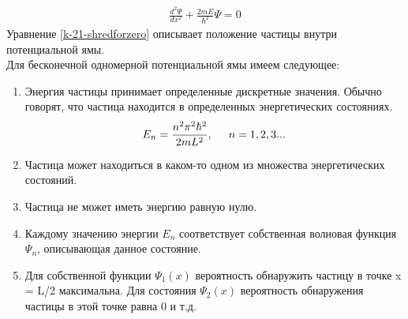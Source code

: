 \documentclass[__main__.tex]{subfiles}
\begin{document}
\begin{gather}
    \label{k-21-shredforzero}
    \frac{d^2\Psi}{dx^2}+\frac{2mE}{\hbar^2}\Psi=0
\end{gather}
Уравнение \ref{k-21-shredforzero} описывает положение частицы внутри потенциальной ямы. \\
Для бесконечной одномерной потенциальной ямы имеем следующее:
\begin{enumerate}
    \item Энергия частицы принимает определенные дискретные значения. Обычно говорят, что частица находится в определенных энергетических состояниях.
          \begin{gather}
              E_n=\frac{n^2\mathcal{\pi}^2\hbar^2}{2mL^2}, \hspace{0.5cm} n=1,2,3...
          \end{gather}
    \item Частица может находиться в каком-то одном из множества энергетических состояний.
    \item Частица не может иметь энергию равную нулю.
    \item Каждому значению энергии $E_n$ соответствует собственная волновая функция $\Psi_n$, описывающая данное состояние.
    \item Для собственной функции $\Psi_1(x)$ вероятность обнаружить частицу в точке x = L/2 максимальна. Для состояния $\Psi_2(x)$ вероятность обнаружения частицы в этой точке равна 0 и т.д.
\end{enumerate}
\end{document}
